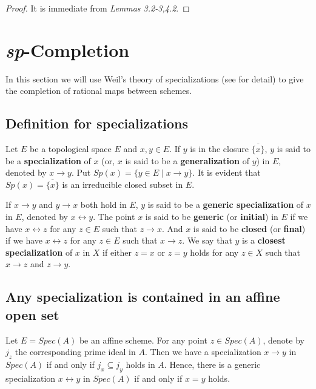 \documentclass[12pt,twoside,reqno]{amsart}
\theoremstyle{definition}
\numberwithin{equation}{section}
\begin{document}
\begin{proof}
It is immediate from \emph{Lemmas 3.2-3,4.2}.
\end{proof}


\section{\emph{sp}-Completion}

In this section we will use Weil's theory of specializations (see \cite{An1} for detail) to give the completion of rational maps between schemes.

\subsection{Definition for specializations}

Let $E$ be a topological
space $E$ and $x,y\in E$. If $y$ is in the closure $\overline{\{x\}}$, $y$ is said to be a \textbf{
specialization} of $x$ (or, $x$ is said to be a \textbf{generalization} of $
y $) in $E$, denoted by $x\rightarrow y$. Put $Sp\left( x\right)
=\{y\in E\mid x\rightarrow y\}$.
 It is evident that $Sp\left( x\right) =\overline{\{x\}}$ is an irreducible closed
 subset in $E$.

 If $x\rightarrow
y$ and $y\rightarrow x$ both hold in $E$, $y$ is said to be a \textbf{generic
specialization} of $x$ in $E$, denoted by $x\leftrightarrow y$. The point $x$
is said to be \textbf{generic} (or \textbf{initial}) in $E$ if we have $
x\leftrightarrow z$ for any $z\in E$ such that $z\rightarrow x$. And $x$ is said to be
\textbf{closed} (or \textbf{final}) if we have $x\leftrightarrow z$ for any $
z\in E$ such that $x\rightarrow z.$ We say that $y$ is a
\textbf{closest specialization}
of $x$ in $X$ if either $z=x$ or $z=y$ holds for any $z\in X$ such that $
x\rightarrow z$ and $z\rightarrow y$.


\subsection{Any specialization is contained in an affine open set}

Let $E=Spec\left( A\right) $ be an affine scheme. For any point
$z\in Spec\left( A\right)$, denote by $j_{z}$ the corresponding
prime ideal in $A$. Then we have a specialization
$x\rightarrow y$ in $Spec\left( A\right) $ if and only if
$j_{x}\subseteq j_{y}$ holds in $A$. Hence, there is a generic
specialization $x\leftrightarrow y$ in $Spec\left( A\right) $ if and
only if $x=y$ holds.
\end{document}

